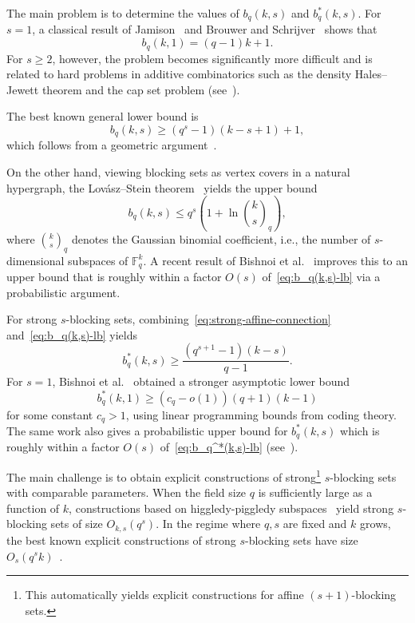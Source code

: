 \documentclass[11pt]{article}
\newcommand{\F}{\mathbb{F}}
\newcommand{\qb}[2]{\genfrac{(}{)}{0pt}{}{#1}{#2}_q}
\begin{document}
The main problem is to determine the values of $b_q(k,s)$ and $b_q^*(k,s)$. For $s=1$, a classical result of Jamison~\cite{Jam77} and Brouwer and Schrijver~\cite{BS78} shows that
\[
b_q(k,1) = (q-1)k+1.
\]
For $s \ge 2$, however, the problem becomes significantly more difficult and is related to hard problems in additive combinatorics such as the density Hales--Jewett theorem and the cap set problem (see~\cite{BDGP24}).

The best known general lower bound is
\begin{equation}\label{eq:b_q(k,s)-lb}
    b_q(k,s) \ge (q^s-1)(k-s+1)+1,
\end{equation}
which follows from a geometric argument~\cite{Bal11}. 

On the other hand, viewing blocking sets as vertex covers in a natural hypergraph, the Lov\'asz--Stein theorem~\cite[Theorem~2.16]{Juk11} yields the upper bound
\[
b_q(k,s) \le q^s \left(1 + \ln\qb{k}{s}\right),
\]
where $\qb{k}{s}$ denotes the Gaussian binomial coefficient, i.e., the number of $s$-dimensional subspaces of $\F_q^k$. A recent result of Bishnoi et al.~\cite{BDGP24} improves this to an upper bound that is roughly within a factor $O(s)$ of~\eqref{eq:b_q(k,s)-lb} via a probabilistic argument.


For strong $s$-blocking sets, combining~\eqref{eq:strong-affine-connection} and~\eqref{eq:b_q(k,s)-lb} yields
\begin{equation}\label{eq:b_q^*(k,s)-lb}
    b_q^*(k,s) \ge \frac{(q^{s+1}-1)(k-s)}{q-1}.
\end{equation}
For $s=1$, Bishnoi et al.~\cite{BDGP24} obtained a stronger asymptotic lower bound
\[
b_q^*(k,1) \ge (c_q - o(1))(q+1)(k-1)
\]
for some constant $c_q > 1$, using linear programming bounds from coding theory. The same work also gives a probabilistic upper bound for $b_q^*(k,s)$ which is roughly within a factor $O(s)$ of~\eqref{eq:b_q^*(k,s)-lb} (see~\cite[Remark~3.4]{BDGP24}).

The main challenge is to obtain explicit constructions of strong\footnote{This automatically yields explicit constructions for affine $(s+1)$-blocking sets.} $s$-blocking sets with comparable parameters. When the field size $q$ is sufficiently large as a function of $k$, constructions based on higgledy-piggledy subspaces~\cite{FZ14,FZ16} yield strong $s$-blocking sets of size $O_{k,s}(q^s)$. In the regime where $q,s$ are fixed and $k$ grows, the best known explicit constructions of strong $s$-blocking sets have size $O_s(q^s k)$~\cite{ABDN24,BT24}.
\end{document}
